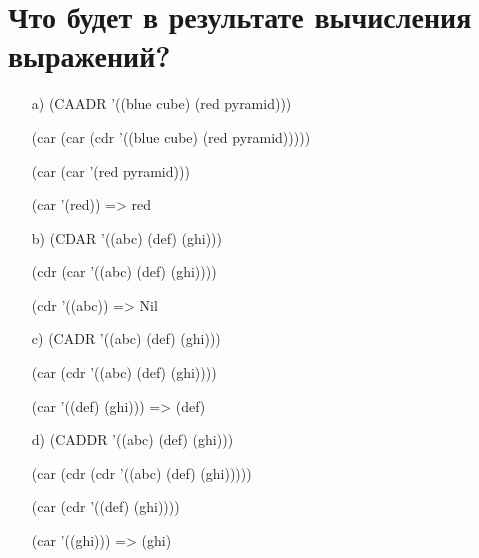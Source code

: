 \section{Что будет в результате вычисления выражений?}
\begin{enumerate}
	\item[a)] (CAADR '((blue cube) (red pyramid)))
	
	(car (car (cdr '((blue cube) (red pyramid)))))
	
	(car (car '(red pyramid)))
	
	(car '(red)) => red
	
	\item[b)] (CDAR '((abc) (def) (ghi)))
	
	(cdr (car '((abc) (def) (ghi))))
	
	(cdr '((abc)) => Nil
	
	\item[c)] (CADR '((abc) (def) (ghi)))
	
	(car (cdr '((abc) (def) (ghi))))
	
	(car '((def) (ghi))) => (def)
	 
	\item[d)]  (CADDR '((abc) (def) (ghi)))
	
	(car (cdr (cdr '((abc) (def) (ghi)))))
	
	(car (cdr '((def) (ghi))))
	
	(car '((ghi))) => (ghi)
\end{enumerate}

